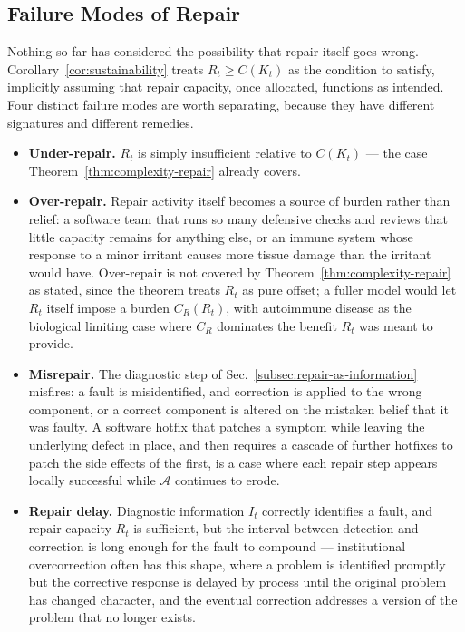 \documentclass[11pt,a4paper]{article}
\theoremstyle{plain}
\theoremstyle{definition}
\theoremstyle{remark}
\newcommand{\Adm}{\mathcal{A}}
\begin{document}
\subsection{Failure Modes of Repair}
\label{subsec:repair-failure-modes}

Nothing so far has considered the possibility that repair itself goes wrong. Corollary~\ref{cor:sustainability} treats $R_t \ge C(K_t)$ as the condition to satisfy, implicitly assuming that repair capacity, once allocated, functions as intended. Four distinct failure modes are worth separating, because they have different signatures and different remedies.

\begin{itemize}
  \item \textbf{Under-repair.} $R_t$ is simply insufficient relative to $C(K_t)$ — the case Theorem~\ref{thm:complexity-repair} already covers.
  \item \textbf{Over-repair.} Repair activity itself becomes a source of burden rather than relief: a software team that runs so many defensive checks and reviews that little capacity remains for anything else, or an immune system whose response to a minor irritant causes more tissue damage than the irritant would have. Over-repair is not covered by Theorem~\ref{thm:complexity-repair} as stated, since the theorem treats $R_t$ as pure offset; a fuller model would let $R_t$ itself impose a burden $C_R(R_t)$, with autoimmune disease as the biological limiting case where $C_R$ dominates the benefit $R_t$ was meant to provide.
  \item \textbf{Misrepair.} The diagnostic step of Sec.~\ref{subsec:repair-as-information} misfires: a fault is misidentified, and correction is applied to the wrong component, or a correct component is altered on the mistaken belief that it was faulty. A software hotfix that patches a symptom while leaving the underlying defect in place, and then requires a cascade of further hotfixes to patch the side effects of the first, is a case where each repair step appears locally successful while $\Adm$ continues to erode.
  \item \textbf{Repair delay.} Diagnostic information $I_t$ correctly identifies a fault, and repair capacity $R_t$ is sufficient, but the interval between detection and correction is long enough for the fault to compound — institutional overcorrection often has this shape, where a problem is identified promptly but the corrective response is delayed by process until the original problem has changed character, and the eventual correction addresses a version of the problem that no longer exists.
\end{itemize}
\end{document}
